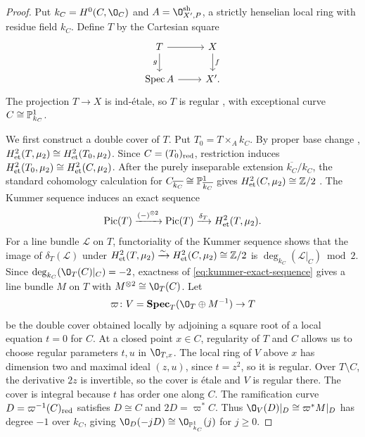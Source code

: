 \begin{proof}
Put $k_C = H^0(C,\O_C)$ and $A = \O^{\rm sh}_{X',P}$, a strictly henselian local ring with residue field $k_C$.
Define $T$ by the Cartesian square
\[
  \begin{tikzcd}
    T \arrow[r] \arrow[d,"g"'] & X \arrow[d,"f"]\\
    \Spec A \arrow[r] & X'.
  \end{tikzcd}
\]
The projection $T\to X$ is ind-\'etale, so $T$ is regular \cite[Tags~ and~]{Stacks}, with exceptional curve $C\cong\mathbb{P}^1_{k_C}$.

We first construct a double cover of $T$.
Put $T_0 = T\times_A k_C$.
By proper base change \cite[Exp.~XII, Corollaire~5.5(iii)]{SGA4}, $H^2_{\rm et}(T,\mu_2)\cong H^2_{\rm et}(T_0,\mu_2)$.
Since $C = (T_0)_{\rm red}$, restriction induces $H^2_{\rm et}(T_0,\mu_2)\cong H^2_{\rm et}(C,\mu_2)$.
After the purely inseparable extension $\overline{k_C}/k_C$, the standard cohomology calculation for $C_{\overline{k_C}}\cong\mathbb{P}^1_{\overline{k_C}}$ gives $H^2_{\rm et}(C,\mu_2)\cong\mathbb{Z}/2$ \cite[Tag~]{Stacks}.
The Kummer sequence induces an exact sequence \cite[Tag~]{Stacks}
\begin{equation}\label{eq:kummer-exact-sequence}
  \operatorname{Pic}(T)\xrightarrow{(-)^{\otimes 2}}\operatorname{Pic}(T)
  \xrightarrow{\delta_T}H^2_{\rm et}(T,\mu_2).
\end{equation}
For a line bundle $\mathcal L$ on $T$, functoriality of the Kummer sequence shows that the image of $\delta_T(\mathcal L)$ under $H^2_{\rm et}(T,\mu_2)\xrightarrow{\sim}H^2_{\rm et}(C,\mu_2)\cong\mathbb{Z}/2$ is $\deg_{k_C}(\mathcal L|_C)\bmod 2$.
Since $\deg_{k_C}(\O_T(C)|_C) = -2$, exactness of \eqref{eq:kummer-exact-sequence} gives a line bundle $M$ on $T$ with $M^{\otimes 2}\cong\O_T(C)$.
Let
\[
  \varpi\from V = \operatorname{\mathbf{Spec}}_T(\O_T\oplus M^{-1})\to T
\]
be the double cover obtained locally by adjoining a square root of a local equation $t = 0$ for $C$.
At a closed point $x\in C$, regularity of $T$ and $C$ allows us to choose regular parameters $t,u$ in $\O_{T,x}$.
The local ring of $V$ above $x$ has dimension two and maximal ideal $(z,u)$, since $t = z^2$, so it is regular.
Over $T\setminus C$, the derivative $2z$ is invertible, so the cover is \'etale and $V$ is regular there.
The cover is integral because $t$ has order one along $C$.
The ramification curve $D = \varpi^{-1}(C)_{\rm red}$ satisfies $D\cong C$ and $2D = \varpi^*C$.
Thus $\O_V(D)|_D\cong\varpi^*M|_D$ has degree $-1$ over $k_C$, giving $\O_D(-jD)\cong\O_{\PP^1_{k_C}}(j)$ for $j\geq 0$.


\end{proof}
